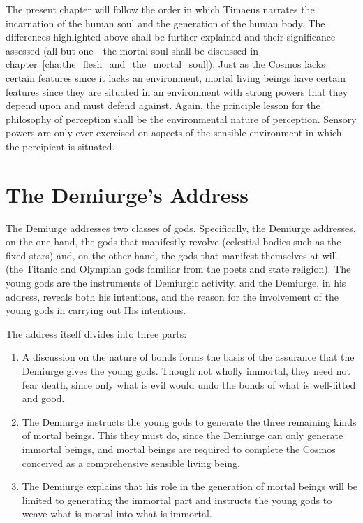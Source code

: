 The present chapter will follow the order in which Timaeus narrates the incarnation of the human soul and the generation of the human body. The differences highlighted above shall be further explained and their significance assessed (all but one---the mortal soul shall be discussed in chapter~\ref{cha:the_flesh_and_the_mortal_soul}). Just as the Cosmos lacks certain features since it lacks an environment, mortal living beings have certain features since they are situated in an environment with strong powers that they depend upon and must defend against. Again, the principle lesson for the philosophy of perception shall be the environmental nature of perception. Sensory powers are only ever exercised on aspects of the sensible environment in which the percipient is situated.


\section{The Demiurge's Address} %
\label{sec:the_demiurge_addressing_the_gods}

The Demiurge addresses two classes of gods. Specifically, the Demiurge addresses, on the one hand, the gods that manifestly revolve (celestial bodies such as the fixed stars) and, on the other hand, the gods that manifest themselves at will (the Titanic and Olympian gods familiar from the poets and state religion). The young gods are the instruments of Demiurgic activity, and the Demiurge, in his address, reveals both his intentions, and the reason for the involvement of the young gods in carrying out His intentions.

The address itself divides into three parts:
\begin{enumerate}[(1)]
	\item A discussion on the nature of bonds forms the basis of the assurance that the Demiurge gives the young gods. Though not wholly immortal, they need not fear death, since only what is evil would undo the bonds of what is well-fitted and good.
	\item The Demiurge instructs the young gods to generate the three remaining kinds of mortal beings. This they must do, since the Demiurge can only generate immortal beings, and mortal beings are required to complete the Cosmos conceived as a comprehensive sensible living being.
	\item The Demiurge explains that his role in the generation of mortal beings will be limited to generating the immortal part and instructs the young gods to weave what is mortal into what is immortal.
\end{enumerate}


